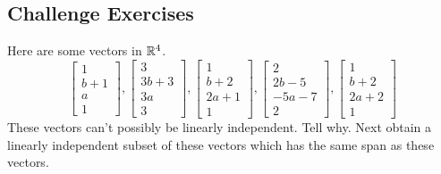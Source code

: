 \documentclass{ximera}
\begin{document}
\subsection*{Challenge Exercises}
\begin{problem}\label{prb:3.35} Here are some vectors in $\mathbb{R}^{4}$.
\begin{equation*}
\left[
\begin{array}{r}
1 \\
b+1 \\
a \\
1
\end{array}
\right] ,\left[
\begin{array}{r}
3 \\
3b+3 \\
3a \\
3
\end{array}
\right] ,\left[
\begin{array}{r}
1 \\
b+2 \\
2a+1 \\
1
\end{array}
\right] ,\left[
\begin{array}{r}
2 \\
2b-5 \\
-5a-7 \\
2
\end{array}
\right] ,\left[
\begin{array}{r}
1 \\
b+2 \\
2a+2 \\
1
\end{array}
\right]
\end{equation*}
These vectors can't possibly be linearly independent. Tell why. Next obtain a
linearly independent subset of these vectors which has the same span as
these vectors. 
\end{problem}
\end{document}
